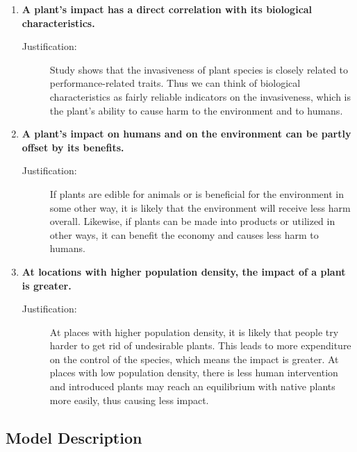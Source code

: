 \documentclass[12pt]{article}
\begin{document}
		\begin{enumerate}
			
			\item \textbf{A plant's impact has a direct correlation with its biological characteristics.}
			\vspace{-0.125in}
			\begin{description}
				\item[Justification:] Study shows that the invasiveness of plant species is closely related to performance-related traits\autocite{van2010meta}.  Thus we can think of biological characteristics as fairly reliable indicators on the invasiveness, which is the plant's ability to cause harm to the environment and to humans.  
			\end{description}
			
			\item \label{assumption:offset} \textbf{A plant's impact on humans and on the environment can be partly offset by its benefits.}
			\vspace{-0.125in}
			\begin{description}
				\item[Justification:] If plants are edible for animals or is beneficial for the environment in some other way, it is likely that the environment will receive less harm overall.  Likewise, if plants can be made into products or utilized in other ways, it can benefit the economy and causes less harm to humans.  
			\end{description}
			
			\item \textbf{At locations with higher population density, the impact of a plant is greater.}
			\vspace{-0.125in}
			\begin{description}
				\item[Justification:] At places with higher population density, it is likely that people try harder to get rid of undesirable plants.  This leads to more expenditure on the control of the species, which means the impact is greater.  At places with low population density, there is less human intervention and introduced plants may reach an equilibrium with native plants more easily, thus causing less impact.  
			\end{description}
			
		\end{enumerate}
	
	\subsection{Model Description}
		
\end{document}
